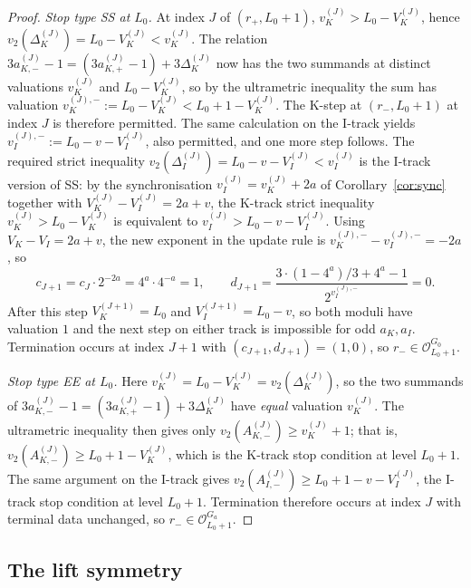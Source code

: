 \documentclass[11pt,reqno]{amsart}
\theoremstyle{plain}
\theoremstyle{definition}
\theoremstyle{remark}
\newcommand{\Obs}{\mathcal{O}}
\newcommand{\Vk}{V_{K}}
\newcommand{\Vi}{V_{I}}
\newcommand{\vk}{v_{K}}
\newcommand{\vi}{v_{I}}
\newcommand{\vtwo}{v_{2}}
\begin{document}
\begin{proof}
\emph{Stop type SS at $L_0$.} At index $J$ of $(r_+, L_0+1)$,
$\vk^{(J)} > L_0 - \Vk^{(J)}$, hence $\vtwo(\Delta_K^{(J)}) = L_0 - \Vk^{(J)} < \vk^{(J)}$.
The relation
$3 a_{K,-}^{(J)} - 1 = (3 a_{K,+}^{(J)} - 1) + 3 \Delta_K^{(J)}$ now has the
two summands at distinct valuations $\vk^{(J)}$ and $L_0 - \Vk^{(J)}$, so by
the ultrametric inequality the sum has valuation
$\vk^{(J),-} := L_0 - \Vk^{(J)} < L_0 + 1 - \Vk^{(J)}$. The K-step at
$(r_-, L_0+1)$ at index $J$ is therefore permitted. The same calculation on the I-track yields
$\vi^{(J),-} := L_0 - v - \Vi^{(J)}$, also permitted, and one more step
follows. The required strict inequality
$\vtwo(\Delta_I^{(J)}) = L_0 - v - \Vi^{(J)} < \vi^{(J)}$ is the
I-track version of SS: by the synchronisation
$\vi^{(J)} = \vk^{(J)} + 2a$ of Corollary~\ref{cor:sync} together with
$\Vk^{(J)} - \Vi^{(J)} = 2a + v$, the K-track strict inequality
$\vk^{(J)} > L_0 - \Vk^{(J)}$ is equivalent to
$\vi^{(J)} > L_0 - v - \Vi^{(J)}$. Using $\Vk - \Vi = 2a + v$, the new exponent in the update rule
is $\vk^{(J),-} - \vi^{(J),-} = -2a$, so
\[
c_{J+1} = c_J \cdot 2^{-2a} = 4^a \cdot 4^{-a} = 1,
\qquad
d_{J+1} = \frac{3 \cdot (1 - 4^a)/3 + 4^a - 1}{2^{\vi^{(J),-}}} = 0.
\]
After this step $\Vk^{(J+1)} = L_0$ and $\Vi^{(J+1)} = L_0 - v$, so both
moduli have valuation $1$ and the next step on either track is impossible
for odd $a_K, a_I$. Termination occurs at index $J + 1$ with
$(c_{J+1}, d_{J+1}) = (1, 0)$, so $r_- \in \Obs_{L_0+1}^{G_0}$.

\emph{Stop type EE at $L_0$.} Here
$\vk^{(J)} = L_0 - \Vk^{(J)} = \vtwo(\Delta_K^{(J)})$, so the two summands
of $3 a_{K,-}^{(J)} - 1 = (3 a_{K,+}^{(J)} - 1) + 3 \Delta_K^{(J)}$ have
\emph{equal} valuation $\vk^{(J)}$. The ultrametric inequality then gives
only $\vtwo(A_{K,-}^{(J)}) \ge \vk^{(J)} + 1$; that is,
$\vtwo(A_{K,-}^{(J)}) \ge L_0 + 1 - \Vk^{(J)}$, which is the K-track stop
condition at level $L_0+1$. The same argument on the I-track gives
$\vtwo(A_{I,-}^{(J)}) \ge L_0 + 1 - v - \Vi^{(J)}$, the I-track stop
condition at level $L_0+1$. Termination therefore occurs at index $J$ with
terminal data unchanged, so $r_- \in \Obs_{L_0+1}^{G_a}$. \qedhere
\end{proof}

\subsection{The lift symmetry}
\end{document}
